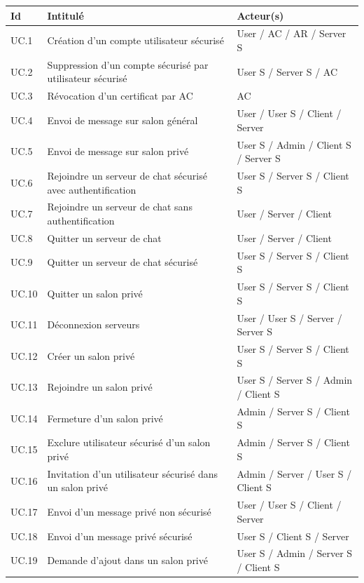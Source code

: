 \documentclass[a4paper,11pt,french]{article}
\begin{document}
\begin{center}
\begin{tabular}{|l|l|l|}
\hline
\bfseries{Id} & \bfseries{Intitulé} & \bfseries{Acteur(s)}\\
\hline
UC.1 & Création d'un compte utilisateur sécurisé & User / AC / AR / Server S\\
\hline
UC.2 & Suppression d'un compte sécurisé par utilisateur sécurisé & User S / Server S / AC\\
\hline
UC.3 & Révocation d'un certificat par AC & AC\\
\hline
UC.4 & Envoi de message sur salon général & User / User S / Client / Server\\
\hline
UC.5 & Envoi de message sur salon privé & User S / Admin / Client S / Server S\\
\hline
UC.6 & Rejoindre un serveur de chat sécurisé avec authentification & User S / Server S / Client S\\
\hline
UC.7 & Rejoindre un serveur de chat sans authentification & User / Server / Client\\
\hline
UC.8 & Quitter un serveur de chat & User / Server / Client\\
\hline
UC.9 & Quitter un serveur de chat sécurisé & User S / Server S / Client S\\
\hline
UC.10 & Quitter un salon privé & User S / Server S / Client S\\
\hline
UC.11 & Déconnexion serveurs & User / User S / Server / Server S\\
\hline
UC.12 & Créer un salon privé & User S / Server S / Client S\\
\hline
UC.13 & Rejoindre un salon privé & User S / Server S / Admin / Client S\\
\hline
UC.14 & Fermeture d'un salon privé & Admin / Server S / Client S\\
\hline
UC.15 & Exclure utilisateur sécurisé d'un salon privé & Admin / Server S / Client S\\
\hline
UC.16 & Invitation d'un utilisateur sécurisé dans un salon privé & Admin / Server / User S / Client S\\
\hline 
UC.17 & Envoi d'un message privé non sécurisé & User / User S / Client / Server\\
\hline
UC.18 & Envoi d'un message privé sécurisé & User S / Client S / Server\\
\hline
UC.19 & Demande d'ajout dans un salon privé & User S / Admin / Server S / Client S\\
\hline
\end{tabular}
\end{center}
\end{document}
